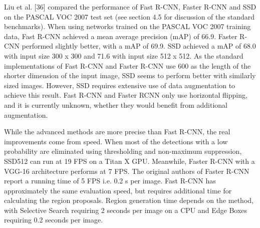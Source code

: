 Liu et al. [36] compared the performance of Fast R-CNN, Faster R-CNN and SSD on the PASCAL VOC 2007 test set (see section 4.5 for discussion of the standard benchmarks). When using networks trained on the PASCAL VOC 2007 training data, Fast R-CNN achieved a mean average precision (mAP) of 66.9. Faster R-CNN performed slightly better, with a mAP of 69.9. SSD achieved a mAP of 68.0 with input size 300 x 300 and 71.6 with input size 512 x 512. As the standard implementations of Fast R-CNN and Faster R-CNN use 600 as the length of the shorter dimension of the input image, SSD seems to perform better with similarly sized images. However, SSD requires extensive use of data augmentation to achieve this result. Fast R-CNN and Faster RCNN only use horizontal flipping, and it is currently unknown, whether they would benefit from additional augmentation.

While the advanced methods are more precise than Fast R-CNN, the real improvements come from speed. When most of the detections with a low probability are eliminated using thresholding and non-maximum suppression, SSD512 can run at 19 FPS on a Titan X GPU. Meanwhile, Faster R-CNN with a VGG-16 architecture performs at 7 FPS. The original authors of Faster R-CNN report a running time of 5 FPS i.e. 0.2 s per image. Fast R-CNN has approximately the same evaluation speed, but requires additional time for calculating the region proposals. Region generation time depends on the method, with Selective Search requiring 2 seconds per image on a CPU and Edge Boxes requiring 0.2 seconds per image.


